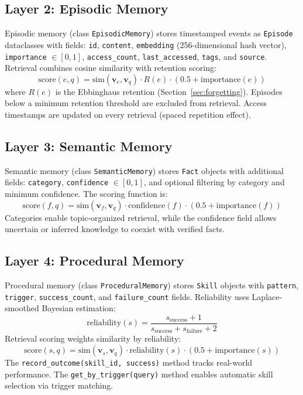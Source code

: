 \documentclass[runningheads]{llncs}
\begin{document}
\subsection{Layer 2: Episodic Memory}\label{sec:episodic}

Episodic memory (class \texttt{EpisodicMemory}) stores timestamped events as \texttt{Episode} dataclasses with fields: \texttt{id}, \texttt{content}, \texttt{embedding} (256-dimensional hash vector), \texttt{importance} $\in [0,1]$, \texttt{access\_count}, \texttt{last\_accessed}, \texttt{tags}, and \texttt{source}. Retrieval combines cosine similarity with retention scoring:
\begin{equation}\label{eq:episodic-score}
    \text{score}(e, q) = \text{sim}(\mathbf{v}_e, \mathbf{v}_q) \cdot R(e) \cdot (0.5 + \text{importance}(e))
\end{equation}
where $R(e)$ is the Ebbinghaus retention (Section~\ref{sec:forgetting}). Episodes below a minimum retention threshold are excluded from retrieval. Access timestamps are updated on every retrieval (spaced repetition effect).

\subsection{Layer 3: Semantic Memory}\label{sec:semantic}

Semantic memory (class \texttt{SemanticMemory}) stores \texttt{Fact} objects with additional fields: \texttt{category}, \texttt{confidence} $\in [0,1]$, and optional filtering by category and minimum confidence. The scoring function is:
\begin{equation}\label{eq:semantic-score}
    \text{score}(f, q) = \text{sim}(\mathbf{v}_f, \mathbf{v}_q) \cdot \text{confidence}(f) \cdot (0.5 + \text{importance}(f))
\end{equation}
Categories enable topic-organized retrieval, while the confidence field allows uncertain or inferred knowledge to coexist with verified facts.

\subsection{Layer 4: Procedural Memory}\label{sec:procedural}

Procedural memory (class \texttt{ProceduralMemory}) stores \texttt{Skill} objects with \texttt{pattern}, \texttt{trigger}, \texttt{success\_count}, and \texttt{failure\_count} fields. Reliability uses Laplace-smoothed Bayesian estimation:
\begin{equation}\label{eq:reliability}
    \text{reliability}(s) = \frac{s_{\text{success}} + 1}{s_{\text{success}} + s_{\text{failure}} + 2}
\end{equation}
Retrieval scoring weights similarity by reliability:
\begin{equation}\label{eq:proc-score}
    \text{score}(s, q) = \text{sim}(\mathbf{v}_s, \mathbf{v}_q) \cdot \text{reliability}(s) \cdot (0.5 + \text{importance}(s))
\end{equation}
The \texttt{record\_outcome(skill\_id, success)} method tracks real-world performance. The \texttt{get\_by\_trigger(query)} method enables automatic skill selection via trigger matching.
\end{document}
